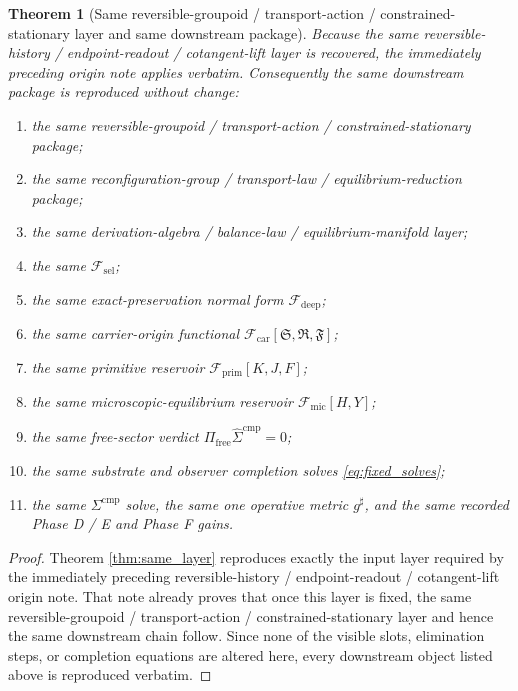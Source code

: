 \documentclass[11pt]{article}
\newcommand{\CompletedMetric}{g^{\sharp}}
\newcommand{\CompLift}{\widehat\Sigma^{\mathrm{cmp}}}
\newcommand{\FreeProj}{\Pi_{\mathrm{free}}}
\newcommand{\GaugeAux}{Y}
\newcommand{\MicFunctional}{\mathscr F_{\mathrm{mic}}}
\newcommand{\PrimFunctional}{\mathscr F_{\mathrm{prim}}}
\newcommand{\CarrierFunctional}{\mathscr F_{\mathrm{car}}}
\newcommand{\DeepFunctional}{\mathscr F_{\mathrm{deep}}}
\newcommand{\StemFunctional}{\mathscr F_{\mathrm{sel}}}
\newcommand{\PrimStrain}{K}
\newcommand{\PrimNeutral}{J}
\newcommand{\PrimFree}{F}
\newcommand{\CarrierSeed}{\mathfrak S}
\newcommand{\RelabelSeed}{\mathfrak R}
\newcommand{\FreeSeed}{\mathfrak F}
\newtheorem{theorem}{Theorem}
\begin{document}
\begin{theorem}[Same reversible-groupoid / transport-action / constrained-stationary layer and same downstream package]
\label{thm:same_package}
Because the same reversible-history / endpoint-readout / cotangent-lift layer is recovered, the immediately preceding origin note applies verbatim. Consequently the same downstream package is reproduced without change:
\begin{enumerate}
    \item the same reversible-groupoid / transport-action / constrained-stationary package;
    \item the same reconfiguration-group / transport-law / equilibrium-reduction package;
    \item the same derivation-algebra / balance-law / equilibrium-manifold layer;
    \item the same \(\StemFunctional\);
    \item the same exact-preservation normal form \(\DeepFunctional\);
    \item the same carrier-origin functional \(\CarrierFunctional[\CarrierSeed,\RelabelSeed,\FreeSeed]\);
    \item the same primitive reservoir \(\PrimFunctional[\PrimStrain,\PrimNeutral,\PrimFree]\);
    \item the same microscopic-equilibrium reservoir \(\MicFunctional[H,\GaugeAux]\);
    \item the same free-sector verdict \(\FreeProj\CompLift=0\);
    \item the same substrate and observer completion solves \eqref{eq:fixed_solves};
    \item the same \(\Sigma^{\mathrm{cmp}}\) solve, the same one operative metric \(\CompletedMetric\), and the same recorded Phase D / E and Phase F gains.
\end{enumerate}
\end{theorem}

\begin{proof}
Theorem \ref{thm:same_layer} reproduces exactly the input layer required by the immediately preceding reversible-history / endpoint-readout / cotangent-lift origin note. That note already proves that once this layer is fixed, the same reversible-groupoid / transport-action / constrained-stationary layer and hence the same downstream chain follow. Since none of the visible slots, elimination steps, or completion equations are altered here, every downstream object listed above is reproduced verbatim.
\end{proof}
\end{document}

